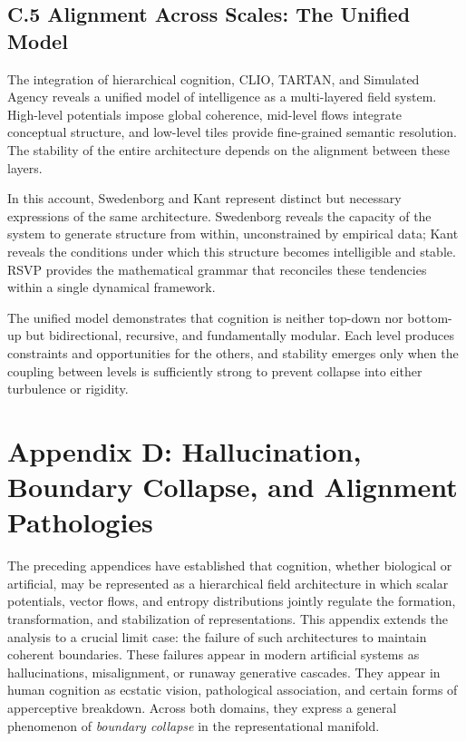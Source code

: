 \documentclass[12pt]{article}
\begin{document}
\subsection*{C.5 Alignment Across Scales: The Unified Model}

The integration of hierarchical cognition, CLIO, TARTAN, and Simulated Agency 
reveals a unified model of intelligence as a multi-layered field system.  
High-level potentials impose global coherence, mid-level flows integrate 
conceptual structure, and low-level tiles provide fine-grained semantic 
resolution. The stability of the entire architecture depends on the alignment 
between these layers.

In this account, Swedenborg and Kant represent distinct but necessary 
expressions of the same architecture. Swedenborg reveals the capacity of the 
system to generate structure from within, unconstrained by empirical data; Kant 
reveals the conditions under which this structure becomes intelligible and 
stable. RSVP provides the mathematical grammar that reconciles these tendencies 
within a single dynamical framework.

The unified model demonstrates that cognition is neither top-down nor bottom-up 
but bidirectional, recursive, and fundamentally modular. Each level produces 
constraints and opportunities for the others, and stability emerges only when 
the coupling between levels is sufficiently strong to prevent collapse into 
either turbulence or rigidity.

\newpage
\section*{Appendix D: Hallucination, Boundary Collapse, and Alignment Pathologies}

The preceding appendices have established that cognition, whether biological or 
artificial, may be represented as a hierarchical field architecture in which 
scalar potentials, vector flows, and entropy distributions jointly regulate the 
formation, transformation, and stabilization of representations. This appendix 
extends the analysis to a crucial limit case: the failure of such architectures 
to maintain coherent boundaries. These failures appear in modern artificial 
systems as hallucinations, misalignment, or runaway generative cascades. They 
appear in human cognition as ecstatic vision, pathological association, and 
certain forms of apperceptive breakdown. Across both domains, they express 
a general phenomenon of \emph{boundary collapse} in the representational 
manifold.
\end{document}
